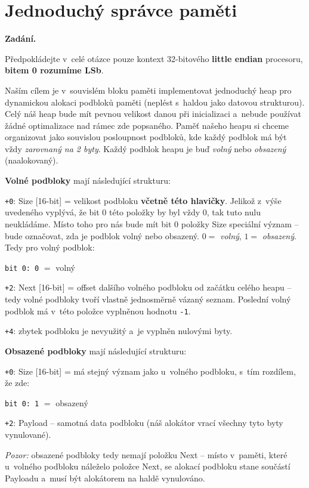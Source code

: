 \section{Jednoduchý správce paměti}

\noindent\textbf{Zadání.}\par
Předpokládejte v~celé otázce pouze kontext 32-bitového \textbf{little endian} procesoru,
\textbf{bitem 0 rozumíme LSb}.

Naším cílem je v~souvislém bloku paměti implementovat jednoduchý heap pro dynamickou
alokaci podbloků paměti (neplést s~haldou jako datovou strukturou). Celý náš heap bude mít
pevnou velikost danou při inicializaci a~nebude používat žádné optimalizace nad rámec zde
popsaného. Paměť našeho heapu si chceme organizovat jako souvislou posloupnost podbloků,
kde každý podblok má být vždy \textit{zarovnaný na 2 byty}. Každý podblok heapu je buď
\textit{volný} nebo \textit{obsazený} (naalokovaný).

\medskip
\noindent\textbf{Volné podbloky} mají následující strukturu:\par
\texttt{+0}: Size [16-bit] = velikost podbloku \textbf{včetně této hlavičky}. Jelikož
z~výše uvedeného vyplývá, že bit 0 této položky by byl vždy 0, tak tuto nulu neukládáme.
Místo toho pro nás bude mít bit 0 položky Size speciální význam -- bude označovat, zda je
podblok volný nebo obsazený. $0 = $ \textit{volný}, $1 = $ \textit{obsazený}. Tedy pro
volný podblok:\par
\texttt{bit 0: 0} $=$ volný\par
\texttt{+2}: Next [16-bit] = offset dalšího volného podbloku od začátku celého heapu --
tedy volné podbloky tvoří vlastně jednosměrně vázaný seznam. Poslední volný podblok má
v~této položce vyplněnou hodnotu \texttt{-1}.\par
\texttt{+4}: zbytek podbloku je nevyužitý a~je vyplněn nulovými byty.

\medskip
\noindent\textbf{Obsazené podbloky} mají následující strukturu:\par
\texttt{+0}: Size [16-bit] = má stejný význam jako u~volného podbloku, s~tím rozdílem, že zde:\par
\texttt{bit 0: 1} $=$ obsazený\par
\texttt{+2}: Payload -- samotná data podbloku (náš alokátor vrací všechny tyto byty
vynulované).\par
\textit{Pozor:} obsazené podbloky tedy nemají položku Next -- místo v~paměti, které
u~volného podbloku náleželo položce Next, se alokací podbloku stane součástí Payloadu
a~musí být alokátorem na haldě vynulováno.

